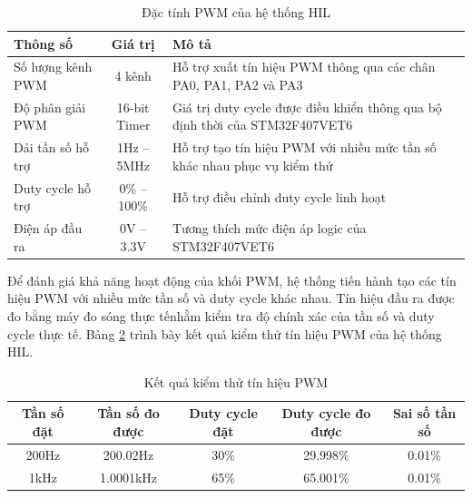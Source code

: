 \begin{table}[H]
\centering
\caption{Đặc tính PWM của hệ thống HIL}
\label{tab:pwm_support}
\renewcommand{\arraystretch}{1.2}

\begin{tabularx}{\textwidth}{|l|c|X|}
\hline
\textbf{Thông số} & \textbf{Giá trị} & \textbf{Mô tả} \\
\hline

Số lượng kênh PWM 
& 4 kênh 
& Hỗ trợ xuất tín hiệu PWM thông qua các chân PA0, PA1, PA2 và PA3 \\
\hline

Độ phân giải PWM 
& 16-bit Timer 
& Giá trị duty cycle được điều khiển thông qua bộ định thời của STM32F407VET6 \\
\hline

Dải tần số hỗ trợ 
& 1Hz -- 5MHz 
& Hỗ trợ tạo tín hiệu PWM với nhiều mức tần số khác nhau phục vụ kiểm thử \\
\hline

Duty cycle hỗ trợ 
& 0\% -- 100\% 
& Hỗ trợ điều chỉnh duty cycle linh hoạt \\
\hline

Điện áp đầu ra 
& 0V -- 3.3V 
& Tương thích mức điện áp logic của STM32F407VET6 \\
\hline

\end{tabularx}
\end{table}

Để đánh giá khả năng hoạt động của khối PWM, hệ thống tiến hành tạo các tín hiệu PWM với nhiều mức tần số và duty cycle khác nhau. Tín hiệu đầu ra được đo bằng máy đo sóng thực tếnhằm kiểm tra độ chính xác của tần số và duty cycle thực tế. Bảng \ref{tab:pwm_result} trình bày kết quả kiểm thử tín hiệu PWM của hệ thống HIL.

\begin{table}[H]
\centering
\caption{Kết quả kiểm thử tín hiệu PWM}
\label{tab:pwm_result}
\renewcommand{\arraystretch}{1.2}

\begin{tabular}{|c|c|c|c|c|}
\hline
\textbf{Tần số đặt} 
& \textbf{Tần số đo được} 
& \textbf{Duty cycle đặt} 
& \textbf{Duty cycle đo được} 
& \textbf{Sai số tần số} \\
\hline

200Hz 
& 200.02Hz 
& 30\% 
& 29.998\% 
& 0.01\% \\
\hline

1kHz 
& 1.0001kHz 
& 65\% 
& 65.001\% 
& 0.01\% \\
\hline

\end{tabular}
\end{table}

